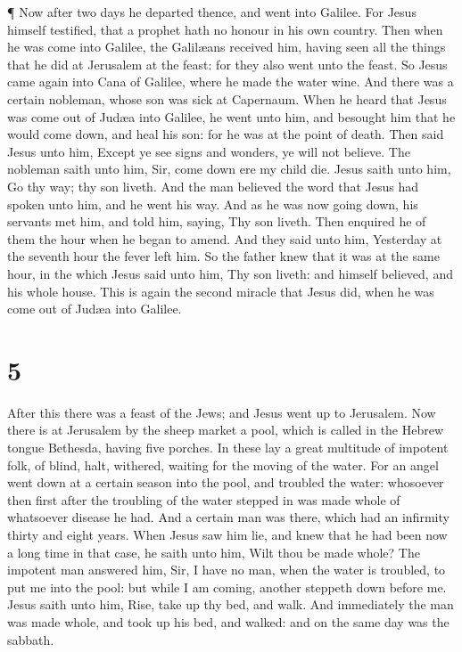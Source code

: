  ¶ Now after two days he departed thence, and went into
Galilee.  For Jesus himself testified, that a prophet hath
no honour in his own country.  Then when he was come into
Galilee, the Galilæans received him, having seen all the things that he
did at Jerusalem at the feast: for they also went unto the feast.
 So Jesus came again into Cana of Galilee, where he made
the water wine. And there was a certain nobleman, whose son was sick at
Capernaum.  When he heard that Jesus was come out of Judæa
into Galilee, he went unto him, and besought him that he would come
down, and heal his son: for he was at the point of death. 
Then said Jesus unto him, Except ye see signs and wonders, ye will not
believe.  The nobleman saith unto him, Sir, come down ere
my child die.  Jesus saith unto him, Go thy way; thy son
liveth. And the man believed the word that Jesus had spoken unto him,
and he went his way.  And as he was now going down, his
servants met him, and told him, saying, Thy son liveth. 
Then enquired he of them the hour when he began to amend. And they said
unto him, Yesterday at the seventh hour the fever left him.
 So the father knew that it was at the same hour, in the
which Jesus said unto him, Thy son liveth: and himself believed, and his
whole house.  This is again the second miracle that Jesus
did, when he was come out of Judæa into Galilee.

\hypertarget{section-4}{%
\section{5}\label{section-4}}

 After this there was a feast of the Jews; and Jesus went up
to Jerusalem.  Now there is at Jerusalem by the sheep market
a pool, which is called in the Hebrew tongue Bethesda, having five
porches.  In these lay a great multitude of impotent folk,
of blind, halt, withered, waiting for the moving of the water.
 For an angel went down at a certain season into the pool,
and troubled the water: whosoever then first after the troubling of the
water stepped in was made whole of whatsoever disease he had.
 And a certain man was there, which had an infirmity thirty
and eight years.  When Jesus saw him lie, and knew that he
had been now a long time in that case, he saith unto him, Wilt thou be
made whole?  The impotent man answered him, Sir, I have no
man, when the water is troubled, to put me into the pool: but while I am
coming, another steppeth down before me.  Jesus saith unto
him, Rise, take up thy bed, and walk.  And immediately the
man was made whole, and took up his bed, and walked: and on the same day
was the sabbath.

